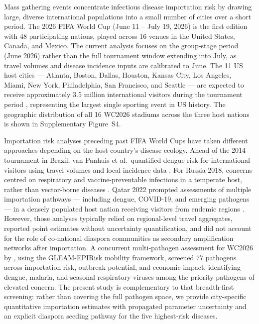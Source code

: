 \documentclass[12pt, a4paper]{article}
\begin{document}
Mass gathering events concentrate infectious disease importation risk
by drawing large, diverse international populations into a small number
of cities over a short period. The 2026 FIFA World Cup (June 11 --
July 19, 2026) is the first edition with 48 participating nations,
played across 16 venues in the United States, Canada, and Mexico.
The current analysis focuses on the group-stage period (June 2026)
rather than the full tournament window extending into July, as travel
volumes and disease incidence inputs are calibrated to June.
The 11 US host cities --- Atlanta, Boston, Dallas, Houston, Kansas
City, Los Angeles, Miami, New York, Philadelphia, San Francisco, and
Seattle --- are expected to receive approximately 3.5 million international
visitors during the tournament period \citep{NTTO2025}, representing
the largest single sporting event in US history. The geographic
distribution of all 16 WC2026 stadiums across the three host nations
is shown in Supplementary Figure~S4.

Importation risk analyses preceding past FIFA World Cups have taken
different approaches depending on the host country's disease ecology.
Ahead of the 2014 tournament in Brazil, van Panhuis et al.\ quantified
dengue risk for international visitors using travel volumes and local
incidence data \citep{vanPanhuis2014}. For Russia 2018, concerns
centred on respiratory and vaccine-preventable infections in a temperate
host, rather than vector-borne diseases \citep{Pshenichnaya2018}.
Qatar 2022 prompted assessments of multiple importation pathways ---
including dengue, COVID-19, and emerging pathogens --- in a densely
populated host nation receiving visitors from endemic regions
\citep{AlTawfiq2022}. However, those analyses typically relied on
regional-level travel aggregates, reported point estimates without
uncertainty quantification, and did not account for the role of
co-national diaspora communities as secondary amplification networks
after importation.
A concurrent multi-pathogen assessment for WC2026 by \citet{Lessler2026},
using the GLEAM-EPIRisk mobility framework, screened 77 pathogens across
importation risk, outbreak potential, and economic impact, identifying
dengue, malaria, and seasonal respiratory viruses among the priority
pathogens of elevated concern. The present study is complementary to
that breadth-first screening: rather than covering the full pathogen
space, we provide city-specific quantitative importation estimates with
propagated parameter uncertainty and an explicit diaspora seeding pathway
for the five highest-risk diseases.
\end{document}
